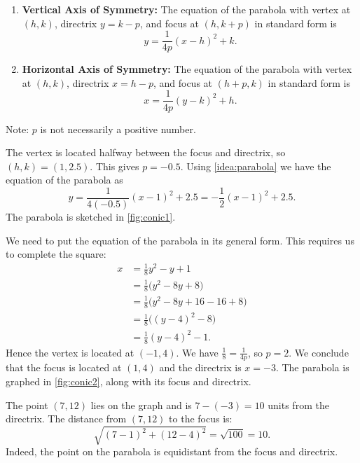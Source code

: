 {\begin{enumerate}
	\item	\textbf{Vertical Axis of Symmetry:} The equation of the parabola with vertex at $(h,k)$, directrix $y=k-p$, and focus at $(h,k+p)$ in standard form is $$y=\frac{1}{4p}(x-h)^2+k.$$
	\item	\textbf{Horizontal Axis of Symmetry:} The  equation of the parabola with vertex at $(h,k)$, directrix $x=h-p$, and focus at $(h+p,k)$ in standard form is $$x=\frac{1}{4p}(y-k)^2+h.$$
\end{enumerate}
Note: $p$ is not necessarily a positive number.}

{%
The vertex is located halfway between the focus and directrix, so $(h,k) = (1,2.5)$. This gives $p=-0.5$. Using \autoref{idea:parabola} we have the equation of the parabola as
\[y=\frac{1}{4(-0.5)}(x-1)^2+2.5 = -\frac12(x-1)^2+2.5.\]
The parabola is sketched in \autoref{fig:conic1}.}

{We need to put the equation of the parabola in its general form. This requires us to complete the square:
\begin{align*}
	x &= \frac18y^2-y+1 \\
	&= \frac18\big(y^2-8y+8\big)\\
	&=	\frac18\big(y^2-8y+16 -16+8\big)\\
	&=	\frac18\big((y-4)^2 - 8\big)\\
	&=	\frac18(y-4)^2 -1.
\end{align*}
Hence the vertex is located at $(-1,4)$.  We have $\frac18=\frac1{4p}$, so $p=2$. We conclude that the focus is located at $(1,4)$ and the directrix is  $x=-3$. The parabola is graphed in \autoref{fig:conic2}, along with its focus and directrix.\bigskip


The point $(7,12)$ lies on the graph and is $7-(-3)=10$ units from the directrix. The distance from $(7,12)$ to the focus is:
$$\sqrt{(7-1)^2 + (12-4)^2} = \sqrt{100}=10.$$ Indeed, the point on the parabola is equidistant from the focus and directrix.}
	
